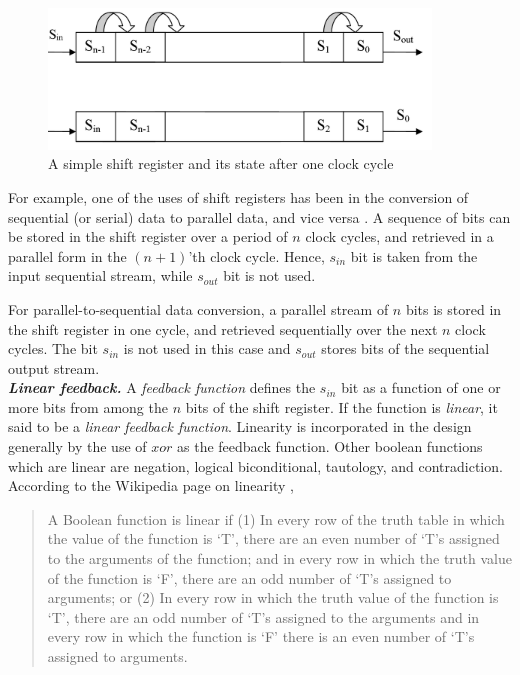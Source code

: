 \begin{figure}[ht!]
	\centering
		\includegraphics[width=4in]{./figures/shift-register.PNG}
	\caption{A simple shift register and its state after one clock cycle}	
	\label{fig:shift-register}
\end{figure}

For example, one of the uses of shift registers has been in the conversion of sequential (or serial) data to parallel data, and vice versa \cite{lfsr-link}. A sequence of bits can be stored in the shift register over a period of $n$ clock cycles, and retrieved in a parallel form in the $(n+1)$'th clock cycle. Hence, $s_{in}$ bit is taken from the input sequential stream, while $s_{out}$ bit is not used. 

For parallel-to-sequential data conversion, a parallel stream of $n$ bits is stored in the shift register in one cycle, and retrieved sequentially over the next $n$ clock cycles. The bit $s_{in}$ is not used in this case and $s_{out}$ stores bits of the sequential output stream.\\

\textbf{\emph{Linear feedback.}} A \textit{feedback function} defines the $s_{in}$ bit as a function of one or more bits from among the $n$ bits of the shift register. If the function is \textit{linear}, it said to be a \textit{linear feedback function}. Linearity is incorporated in the design generally by the use of $xor$ as the feedback function. Other boolean functions which are linear are negation, logical biconditional, tautology, and contradiction. According to the Wikipedia page on linearity \cite{linear-wiki}, 
\begin{quote}
\footnotesize{A Boolean function is linear if (1) In every row of the truth table in which the value of the function is `T', there are an even number of `T's assigned to the arguments of the function; and in every row in which the truth value of the function is `F', there are an odd number of `T's assigned to arguments; or (2) In every row in which the truth value of the function is `T', there are an odd number of `T's assigned to the arguments and in every row in which the function is `F' there is an even number of `T's assigned to arguments.
}
\end{quote}

